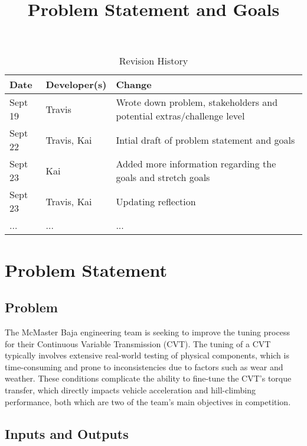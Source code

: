 \documentclass{article}
\title{Problem Statement and Goals\\\progname}
\author{\authname}
\date{}
\begin{document}
\maketitle

\begin{table}[hp]
\caption{Revision History} \label{TblRevisionHistory}
\begin{tabularx}{\textwidth}{llX}
\toprule
\textbf{Date} & \textbf{Developer(s)} & \textbf{Change}\\
\midrule
Sept 19 & Travis & Wrote down problem, stakeholders and potential extras/challenge level\\
Sept 22 & Travis, Kai & Intial draft of problem statement and goals\\
Sept 23 & Kai & Added more information regarding the goals and stretch goals\\
Sept 23 & Travis, Kai & Updating reflection\\
... & ... & ...\\
\bottomrule
\end{tabularx}
\end{table}

\section{Problem Statement}

\subsection{Problem}
The McMaster Baja engineering team is seeking to improve the tuning process for their Continuous Variable Transmission (CVT). The tuning of a CVT typically involves extensive real-world testing of physical components, which is time-consuming and prone to inconsistencies due to factors such as wear and weather. These conditions complicate the ability to fine-tune the CVT’s torque transfer, which directly impacts vehicle acceleration and hill-climbing performance, both which are two of the team's main objectives in competition.


\subsection{Inputs and Outputs}
\end{document}
